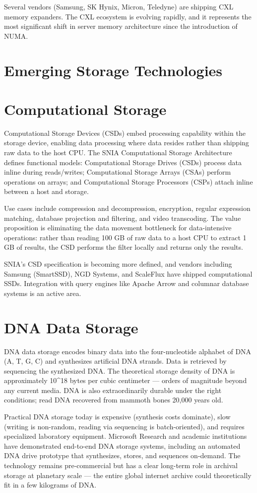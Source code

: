 Several vendors (Samsung, SK Hynix, Micron, Teledyne) are shipping CXL memory expanders. The CXL ecosystem is evolving rapidly, and it represents the most significant shift in server memory architecture since the introduction of NUMA.

\section{Emerging Storage Technologies}
\section{Computational Storage}
Computational Storage Devices (CSDs) embed processing capability within the storage device, enabling data processing where data resides rather than shipping raw data to the host CPU. The SNIA Computational Storage Architecture defines functional models: Computational Storage Drives (CSDs) process data inline during reads/writes; Computational Storage Arrays (CSAs) perform operations on arrays; and Computational Storage Processors (CSPs) attach inline between a host and storage.

Use cases include compression and decompression, encryption, regular expression matching, database projection and filtering, and video transcoding. The value proposition is eliminating the data movement bottleneck for data-intensive operations: rather than reading 100 GB of raw data to a host CPU to extract 1 GB of results, the CSD performs the filter locally and returns only the results.

SNIA's CSD specification is becoming more defined, and vendors including Samsung (SmartSSD), NGD Systems, and ScaleFlux have shipped computational SSDs. Integration with query engines like Apache Arrow and columnar database systems is an active area.

\section{DNA Data Storage}
DNA data storage encodes binary data into the four-nucleotide alphabet of DNA (A, T, G, C) and synthesizes artificial DNA strands. Data is retrieved by sequencing the synthesized DNA. The theoretical storage density of DNA is approximately 10\^{}18 bytes per cubic centimeter --- orders of magnitude beyond any current media. DNA is also extraordinarily durable under the right conditions; read DNA recovered from mammoth bones 20,000 years old.

Practical DNA storage today is expensive (synthesis costs dominate), slow (writing is non-random, reading via sequencing is batch-oriented), and requires specialized laboratory equipment. Microsoft Research and academic institutions have demonstrated end-to-end DNA storage systems, including an automated DNA drive prototype that synthesizes, stores, and sequences on-demand. The technology remains pre-commercial but has a clear long-term role in archival storage at planetary scale --- the entire global internet archive could theoretically fit in a few kilograms of DNA.

